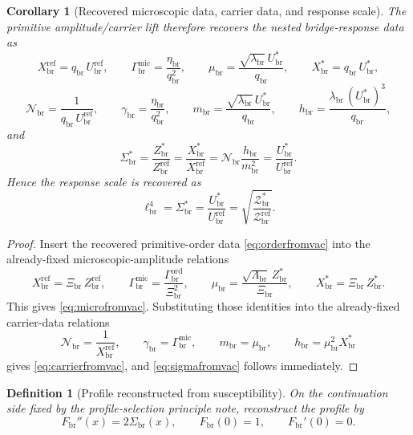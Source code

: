 \documentclass[11pt]{article}
\newcommand{\CurvScale}{\ell_{\mathrm{br}}}
\newcommand{\CurvProfile}{F_{\mathrm{br}}}
\newcommand{\RespSus}{\Sigma_{\mathrm{br}}}
\newcommand{\RespSusEq}{\Sigma_{\mathrm{br}}^{\ast}}
\newcommand{\RespNorm}{\mathcal N_{\mathrm{br}}}
\newcommand{\RespFluxCoeff}{\gamma_{\mathrm{br}}}
\newcommand{\RespGap}{m_{\mathrm{br}}}
\newcommand{\RespBias}{h_{\mathrm{br}}}
\newcommand{\RespMicroEq}{X_{\mathrm{br}}^{\ast}}
\newcommand{\RespMicroRef}{X_{\mathrm{br}}^{\mathrm{ref}}}
\newcommand{\RespMicroFluxCoeff}{\Gamma_{\mathrm{br}}^{\mathrm{mic}}}
\newcommand{\RespMicroGap}{\mu_{\mathrm{br}}}
\newcommand{\RespOrderRef}{Z_{\mathrm{br}}^{\mathrm{ref}}}
\newcommand{\RespOrderEq}{Z_{\mathrm{br}}^{\ast}}
\newcommand{\RespOrderReadout}{\Xi_{\mathrm{br}}}
\newcommand{\RespOrderStiff}{\Gamma_{\mathrm{br}}^{\mathrm{ord}}}
\newcommand{\RespOrderQuartic}{\Lambda_{\mathrm{br}}}
\newcommand{\RespDeepDensityRef}{\mathcal Z_{\mathrm{br}}^{\mathrm{ref}}}
\newcommand{\RespDeepDensityEq}{\mathcal Z_{\mathrm{br}}^{\ast}}
\newcommand{\RespVacRef}{U_{\mathrm{br}}^{\mathrm{ref}}}
\newcommand{\RespVacEq}{U_{\mathrm{br}}^{\ast}}
\newcommand{\RespVacReadout}{q_{\mathrm{br}}}
\newcommand{\RespVacWell}{\lambda_{\mathrm{br}}}
\newcommand{\RespVacIso}{\eta_{\mathrm{br}}}
\newtheorem{definition}{Definition}
\newtheorem{corollary}{Corollary}
\begin{document}
\begin{corollary}[Recovered microscopic data, carrier data, and response scale]
\label{cor:nesteddata}
The primitive amplitude/carrier lift therefore recovers the nested bridge-response data as
\begin{equation}
\RespMicroRef=\RespVacReadout\,\RespVacRef,
\qquad
\RespMicroFluxCoeff=\frac{\RespVacIso}{\RespVacReadout^2},
\qquad
\RespMicroGap=\frac{\sqrt{\RespVacWell}\,\RespVacEq}{\RespVacReadout},
\qquad
\RespMicroEq=\RespVacReadout\,\RespVacEq,
\label{eq:microfromvac}
\end{equation}
\begin{equation}
\RespNorm=\frac{1}{\RespVacReadout\,\RespVacRef},
\qquad
\RespFluxCoeff=\frac{\RespVacIso}{\RespVacReadout^2},
\qquad
\RespGap=\frac{\sqrt{\RespVacWell}\,\RespVacEq}{\RespVacReadout},
\qquad
\RespBias=\frac{\RespVacWell\,(\RespVacEq)^3}{\RespVacReadout},
\label{eq:carrierfromvac}
\end{equation}
and
\begin{equation}
\RespSusEq
=
\frac{\RespOrderEq}{\RespOrderRef}
=
\frac{\RespMicroEq}{\RespMicroRef}
=
\RespNorm\frac{\RespBias}{\RespGap^2}
=
\frac{\RespVacEq}{\RespVacRef}.
\label{eq:sigmafromvac}
\end{equation}
Hence the response scale is recovered as
\begin{equation}
\CurvScale^4=\RespSusEq=\frac{\RespVacEq}{\RespVacRef}
=
\sqrt{\frac{\RespDeepDensityEq}{\RespDeepDensityRef}}.
\label{eq:scalefromvac}
\end{equation}
\end{corollary}

\begin{proof}
Insert the recovered primitive-order data \eqref{eq:orderfromvac} into the already-fixed microscopic-amplitude relations
\[
\RespMicroRef=\RespOrderReadout\,\RespOrderRef,
\qquad
\RespMicroFluxCoeff=\frac{\RespOrderStiff}{\RespOrderReadout^2},
\qquad
\RespMicroGap=\frac{\sqrt{\RespOrderQuartic}\,\RespOrderEq}{\RespOrderReadout},
\qquad
\RespMicroEq=\RespOrderReadout\,\RespOrderEq.
\]
This gives \eqref{eq:microfromvac}. Substituting those identities into the already-fixed carrier-data relations
\[
\RespNorm=\frac{1}{\RespMicroRef},
\qquad
\RespFluxCoeff=\RespMicroFluxCoeff,
\qquad
\RespGap=\RespMicroGap,
\qquad
\RespBias=\RespMicroGap^2\RespMicroEq
\]
gives \eqref{eq:carrierfromvac}, and \eqref{eq:sigmafromvac} follows immediately.
\end{proof}

\begin{definition}[Profile reconstructed from susceptibility]
\label{def:profilereconstruction}
On the continuation side fixed by the profile-selection principle note, reconstruct the profile by
\begin{equation}
\CurvProfile''(x)=2\RespSus(x),
\qquad
\CurvProfile(0)=1,
\qquad
\CurvProfile'(0)=0.
\label{eq:profilereconstruction}
\end{equation}
\end{definition}
\end{document}

